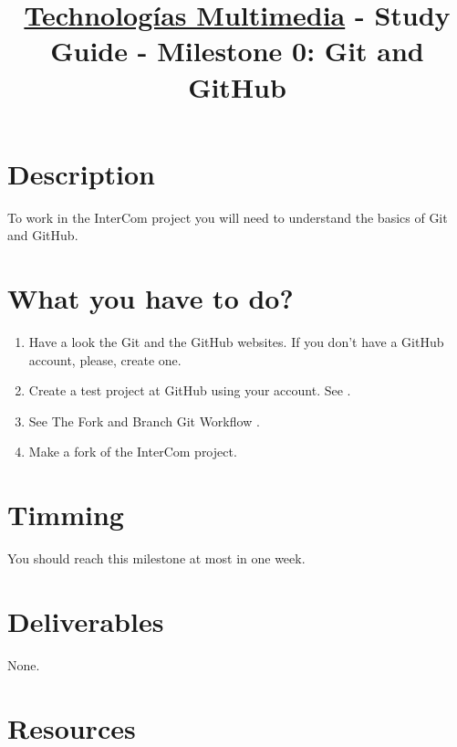 \title{\href{https://www.ual.es/estudios/grados/presentacion/plandeestudios/asignatura/4015/40154321?idioma=zh_CN}{Technologías Multimedia} - Study Guide - Milestone 0: Git and GitHub}

\maketitle

\section{Description}

To work in the InterCom project \cite{intercom} you will need to
understand the basics of Git and GitHub.

\section{What you have to do?}

\begin{enumerate}
\item Have a look the Git \cite{Git, Git-book} and the GitHub
  \cite{GitHub} websites. If you don't have a GitHub account, please,
  create one.
\item Create a test project at GitHub using your account. See
  \cite{GitHub-HW}.
\item See The Fork and Branch Git Workflow \cite{Git-workflow}.
\item Make a fork of the InterCom \cite{intercom} project. 
\end{enumerate}

\section{Timming}

You should reach this milestone at most in one week.

\section{Deliverables}

None.

\section{Resources}


